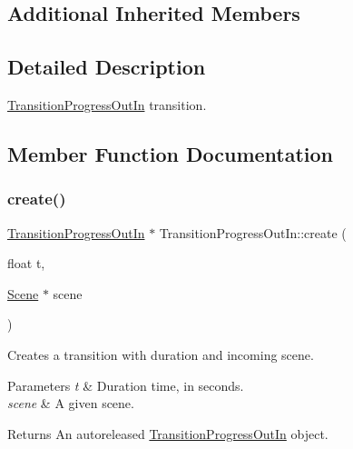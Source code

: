 \subsection*{Additional Inherited Members}


\subsection{Detailed Description}
\hyperlink{classTransitionProgressOutIn}{Transition\+Progress\+Out\+In} transition. 

\subsection{Member Function Documentation}
\mbox{\label{classTransitionProgressOutIn_a3ec6efb28d06f358834aeed017eba7aa}} 
\subsubsection{\texorpdfstring{create()}{create()}\hspace{0.1cm}{\footnotesize\ttfamily [1/2]}}
{\footnotesize\ttfamily \hyperlink{classTransitionProgressOutIn}{Transition\+Progress\+Out\+In} $\ast$ Transition\+Progress\+Out\+In\+::create (\begin{DoxyParamCaption}\item[{float}]{t,  }\item[{\hyperlink{classScene}{Scene} $\ast$}]{scene }\end{DoxyParamCaption})\hspace{0.3cm}{\ttfamily [static]}}

Creates a transition with duration and incoming scene.


\begin{DoxyParams}{Parameters}
{\em t} & Duration time, in seconds. \\
\hline
{\em scene} & A given scene. \\
\hline
\end{DoxyParams}
\begin{DoxyReturn}{Returns}
An autoreleased \hyperlink{classTransitionProgressOutIn}{Transition\+Progress\+Out\+In} object. 
\end{DoxyReturn}
\mbox{\label{classTransitionProgressOutIn_a53f81a859e993393dcac961c4f803635}} 
